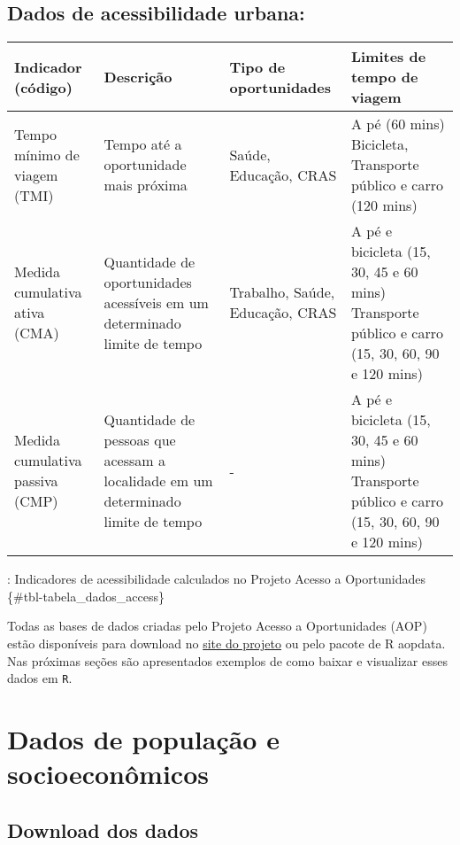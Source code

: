 \documentclass[
  letterpaper,
  DIV=11,
  numbers=noendperiod]{scrreprt}
\begin{document}
\hypertarget{dados-de-acessibilidade-urbana}{%
\section*{Dados de acessibilidade
urbana:}\label{dados-de-acessibilidade-urbana}}

\begin{longtable}[]{@{}llll@{}}
\toprule()
Indicador (código) & Descrição & Tipo de oportunidades & Limites de
tempo de viagem \\
\midrule()
\endhead
Tempo mínimo de viagem (TMI) & Tempo até a oportunidade mais próxima &
Saúde, Educação, CRAS & A pé (60 mins) Bicicleta, Transporte público e
carro (120 mins) \\
Medida cumulativa ativa (CMA) & Quantidade de oportunidades acessíveis
em um determinado limite de tempo & Trabalho, Saúde, Educação, CRAS & A
pé e bicicleta (15, 30, 45 e 60 mins) Transporte público e carro (15,
30, 60, 90 e 120 mins) \\
Medida cumulativa passiva (CMP) & Quantidade de pessoas que acessam a
localidade em um determinado limite de tempo & - & A pé e bicicleta (15,
30, 45 e 60 mins) Transporte público e carro (15, 30, 60, 90 e 120
mins) \\
\bottomrule()
\end{longtable}

: Indicadores de acessibilidade calculados no Projeto Acesso a
Oportunidades \{\#tbl-tabela\_dados\_access\}

Todas as bases de dados criadas pelo Projeto Acesso a Oportunidades
(AOP) estão disponíveis para download no
\href{https://www.ipea.gov.br/acessooportunidades/dados/}{site do
projeto} ou pelo pacote de R aopdata. Nas próximas seções são
apresentados exemplos de como baixar e visualizar esses dados em
\texttt{R}.

\hypertarget{dados-de-populauxe7uxe3o-e-socioeconuxf4micos}{%
\chapter{Dados de população e
socioeconômicos}\label{dados-de-populauxe7uxe3o-e-socioeconuxf4micos}}

\hypertarget{download-dos-dados}{%
\section{Download dos dados}\label{download-dos-dados}}
\end{document}
